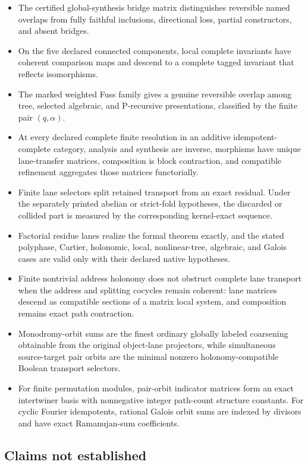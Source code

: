 \begin{itemize}
\item The certified global-synthesis bridge matrix distinguishes reversible named overlaps from fully faithful inclusions, directional loss, partial constructors, and absent bridges.
\item On the five declared connected components, local complete invariants have coherent comparison maps and descend to a complete tagged invariant that reflects isomorphisms.
\item The marked weighted Fuss family gives a genuine reversible overlap among tree, selected algebraic, and P-recursive presentations, classified by the finite pair \((q,\alpha)\).
\item At every declared complete finite resolution in an additive idempotent-complete category, analysis and synthesis are inverse, morphisms have unique lane-transfer matrices, composition is block contraction, and compatible refinement aggregates those matrices functorially.
\item Finite lane selectors split retained transport from an exact residual. Under the separately printed abelian or strict-fold hypotheses, the discarded or collided part is measured by the corresponding kernel-exact sequence.
\item Factorial residue lanes realize the formal theorem exactly, and the stated polyphase, Cartier, holonomic, local, nonlinear-tree, algebraic, and Galois cases are valid only with their declared native hypotheses.
\item Finite nontrivial address holonomy does not obstruct complete lane transport when the address and splitting cocycles remain coherent: lane matrices descend as compatible sections of a matrix local system, and composition remains exact path contraction.
\item Monodromy-orbit sums are the finest ordinary globally labeled coarsening obtainable from the original object-lane projectors, while simultaneous source-target pair orbits are the minimal nonzero holonomy-compatible Boolean transport selectors.
\item For finite permutation modules, pair-orbit indicator matrices form an exact intertwiner basis with nonnegative integer path-count structure constants. For cyclic Fourier idempotents, rational Galois orbit sums are indexed by divisors and have exact Ramanujan-sum coefficients.
\end{itemize}

\subsection{Claims not established}

